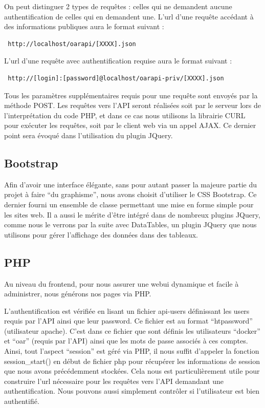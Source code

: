 \documentclass[a4paper,10pt]{article}
\begin{document}
On peut distinguer 2 types de requêtes : celles qui ne demandent aucune authentification de celles qui en demandent une.
L'url d'une requête accédant à des informations publiques aura le format suivant :

\begin{verbatim}
 http://localhost/oarapi/[XXXX].json
\end{verbatim}

L'url d'une requête avec authentification requise aura le format suivant :

\begin{verbatim}
 http://[login]:[password]@localhost/oarapi-priv/[XXXX].json
\end{verbatim}

Tous les paramètres supplémentaires requis pour une requête sont envoyés par la méthode POST.
Les requêtes vers l'API seront réalisées soit par le serveur lors de l'interprétation du code PHP, et dans ce cas nous utilisons la librairie CURL pour exécuter les requêtes,
soit par le client web via un appel AJAX.
Ce dernier point sera évoqué dans l'utilisation du plugin JQuery.

\subsection{Bootstrap}
Afin d'avoir une interface élégante, sans pour autant passer la majeure partie du projet à faire ``du graphisme'', nous avons choisit d'utiliser le CSS Bootstrap. Ce dernier fourni un ensemble de classe permettant
une mise en forme simple pour les sites web. Il a aussi le mérite d'être intégré dans de nombreux plugins JQuery, comme nous le verrons par la suite avec DataTables, un plugin JQuery que nous utilisons
pour gérer l'affichage des données dans des tableaux.

\subsection{PHP}
Au niveau du frontend, pour nous assurer une webui dynamique et facile à administrer, nous générons nos pages via PHP.

L'authentification est vérifiée en lisant un fichier api-users définissant les users requis par l'API ainsi que leur password. Ce fichier est au format ``htpassword'' (utilisateur apache).
C'est dans ce fichier que sont définis les utilisateurs ``docker'' et ``oar'' (requis par l'API) ainsi que les mots de passe associés à ces comptes.
Ainsi, tout l'aspect ``session'' est géré via PHP, il nous suffit d'appeler la fonction session\_start() en début de fichier php pour récupérer les informations de session que nous avons précédemment stockées.
Cela nous est particulièrement utile pour construire l'url nécessaire pour les requêtes vers l'API demandant une authentification. Nous pouvons aussi simplement contrôler si l'utilisateur est bien authentifié.
\vspace{0.5cm}
\end{document}
